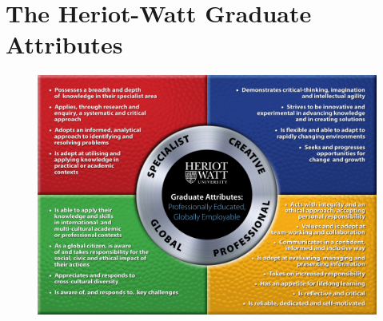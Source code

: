 
\chapter{The Heriot-Watt Graduate Attributes} %

\label{App:HWgrad} %



\begin{figure}[htbp]
	\centering
	\includegraphics[width=\textwidth]{Appendices/gradattributes-visual.pdf}
\end{figure}